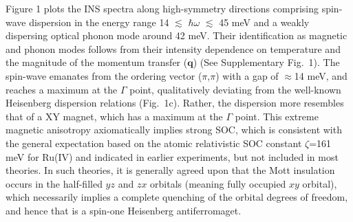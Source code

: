Figure 1 plots the INS spectra along high-symmetry directions comprising spin-wave dispersion in the energy range 14 $\lesssim$ $\hbar\omega$ $\lesssim$ 45 meV and a weakly dispersing optical phonon mode around 42 meV. Their identification as magnetic and phonon modes follows from their intensity dependence on temperature and the magnitude of the momentum transfer ($\mathbf{q}$) (See Supplementary Fig.~1). The spin-wave emanates from the ordering vector ($\pi$,$\pi$) with a gap of $\approx$14 meV, and reaches a maximum at the $\Gamma$ point, qualitatively deviating from the well-known Heisenberg dispersion relations (Fig.~1c). Rather, the dispersion more resembles that of a XY magnet, which has a maximum at the $\Gamma$ point. This extreme magnetic anisotropy axiomatically implies strong SOC, which is consistent with the general expectation based on the atomic relativistic SOC constant $\zeta$=161 meV for Ru(IV) and indicated in earlier experiments, but not included in most theories. In such theories, it is generally agreed upon that the Mott insulation occurs in the half-filled $yz$ and $zx$ orbitals (meaning fully occupied $xy$ orbital), which necessarily implies a complete quenching of the orbital degrees of freedom, and hence that \CRO is a spin-one Heisenberg antiferromaget.